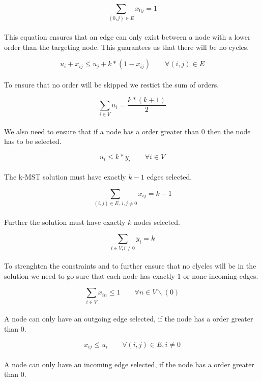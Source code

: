 \begin{equation}
  \sum_{(0,j) \in E} x_{0j} = 1 
\end{equation}
\\
This equation ensures that an edge can only exist between a node with a lower order than the targeting node. This guarantees us that there will be no cycles.

\begin{equation}
  u_{i} + x_{ij} \leq u_{j} + k*(1- x_{ij}) \qquad \forall (i,j) \in E 
\end{equation}
\\
To ensure that no order will be skipped we restict the sum of orders.

\begin{equation}
  \sum_{i \in V} u_i = \frac{k*(k+1)}{2} 
\end{equation}
\\
We also need to ensure that if a node has a order greater than $0$ then the node has to be selected.

\begin{equation}
  u_i \leq k*y_i \qquad \forall i \in V
\end{equation}
\\
The k-MST solution must have exactly $k-1$ edges selected.

\begin{equation}
  \sum_{(i,j) \in E, \ i,j \not =  0} x_{ij} = k-1 
\end{equation}
\\
Further the solution must have exactly $k$ nodes selected.

\begin{equation}
  \sum_{i \in V, i \neq 0} y_i = k
\end{equation}
\\
To strenghten the constraints and to further ensure that no clycles will be in the solution we need to go sure that each node has exactly $1$ or none incoming edges.

\begin{equation}
  \sum_{i \in V} {x_{in}} \leq 1 \qquad \forall n \in V \backslash (0)
\end{equation}
\\
A node can only have an outgoing edge selected, if the node has a order greater than $0$.

\begin{equation}
  x_{ij} \leq u_i \qquad \forall (i,j) \in E, i \neq 0
\end{equation}
\\
A node can only have an incoming edge selected, if the node has a order greater than $0$.

